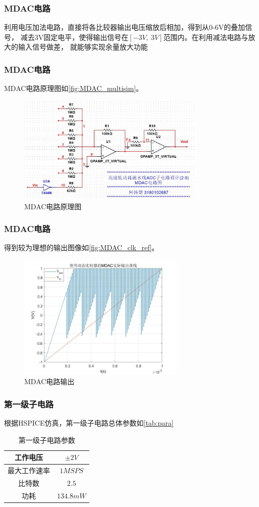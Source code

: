 \documentclass[10pt, mathserif]{beamer}	%
\newcommand{\ftitle}[1]{\frametitle{#1}}	%
\begin{document}
	\begin{frame}
		\ftitle{MDAC电路}
		利用电压加法电路，直接将各比较器输出电压缩放后相加，得到从0-6V的叠加信号，
		减去3V固定电平，使得输出信号在$[-3V,\ 3V]$范围内。在利用减法电路与放大的输入信号做差，
		就能够实现余量放大功能	
	\end{frame}


	\begin{frame}
		\ftitle{MDAC电路}
		\par MDAC电路原理图如\autoref{fig:MDAC_multisim}。
		\begin{figure}[H]
			\centering
			\includegraphics[width=9cm]{MDAC_multisim}
			\caption{\label{fig:MDAC_multisim}MDAC电路原理图}
		\end{figure}		
	\end{frame}

	\begin{frame}
		\ftitle{MDAC电路}
		得到较为理想的输出图像如\autoref{fig:MDAC_clk_ref}。
		\begin{figure}[H]
			\centering
			\includegraphics[width=8cm]{MDAC_clk_ref}
			\caption{\label{fig:MDAC_clk_ref}MDAC电路输出}
		\end{figure}	
	\end{frame}

	\begin{frame}
		\ftitle{第一级子电路}
		根据HSPICE仿真，第一级子电路总体参数如\autoref{tab:para}
		\begin{table}[H]
			\centering
			\caption{\label{tab:para}第一级子电路参数}
			\begin{tabular}{|c|c|}
				\hline
				工作电压 & $ \pm 2V $ \\ \hline
				最大工作速率 & $1MSPS$ \\ \hline
				比特数 & $2.5$  \\ \hline
				功耗 & $134.8mW$  \\ \hline
			\end{tabular}
		\end{table}
	\end{frame}
\end{document}
